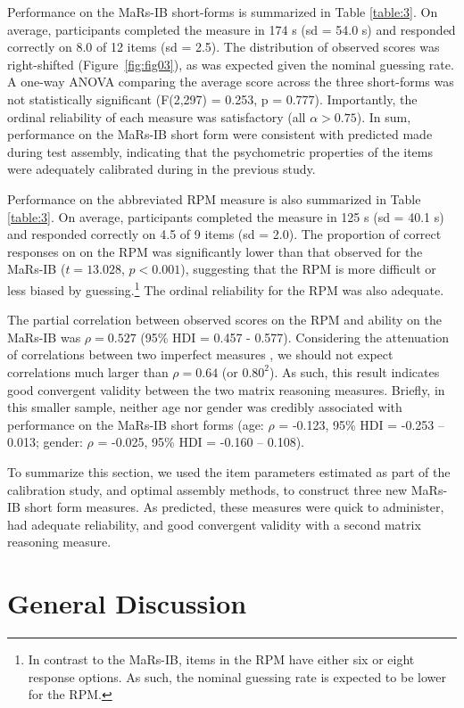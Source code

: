 \documentclass[a4paper,man,natbib]{apa6}
\begin{document}
Performance on the MaRs-IB short-forms is summarized in Table \ref{table:3}. On average, participants completed the measure in 174 s (sd = 54.0 s) and responded correctly on 8.0 of 12 items (sd = 2.5). The distribution of observed scores was right-shifted (Figure~\ref{fig:fig03}), as was expected given the nominal guessing rate. A one-way ANOVA comparing the average score across the three short-forms was not statistically significant (F(2,297) = 0.253, p = 0.777). Importantly, the ordinal reliability of each measure was satisfactory (all $\alpha > 0.75$). In sum, performance on the MaRs-IB short form were consistent with predicted made during test assembly, indicating that the psychometric properties of the items were adequately calibrated during in the previous study.

Performance on the abbreviated RPM measure is also summarized in Table \ref{table:3}. On average, participants completed the measure in 125 s (sd = 40.1 s) and responded correctly on 4.5 of 9 items (sd = 2.0). The proportion of correct responses on on the RPM was significantly lower than that observed for the MaRs-IB ($t = 13.028$, $p < 0.001$), suggesting that the RPM is more difficult or less biased by guessing.\footnote{In contrast to the MaRs-IB, items in the RPM have either six or eight response options. As such, the nominal guessing rate is expected to be lower for the RPM.} The ordinal reliability for the RPM was also adequate.

The partial correlation between observed scores on the RPM and ability on the MaRs-IB was $\rho = 0.527$ (95\% HDI = 0.457 - 0.577). Considering the attenuation of correlations between two imperfect measures \citep{spearman1961proof}, we should not expect correlations much larger than $\rho = 0.64$ (or $0.80^2$). As such, this result indicates good convergent validity between the two matrix reasoning measures. Briefly, in this smaller sample, neither age nor gender was credibly associated with performance on the MaRs-IB short forms (age: $\rho$ = -0.123, 95\% HDI = -0.253 -- 0.013; gender: $\rho$ = -0.025, 95\% HDI = -0.160 -- 0.108). 

To summarize this section, we used the item parameters estimated as part of the calibration study, and optimal assembly methods, to construct three new MaRs-IB short form measures. As predicted, these measures were quick to administer, had adequate reliability, and good convergent validity with a second matrix reasoning measure. 

\section{General Discussion}
\end{document}
